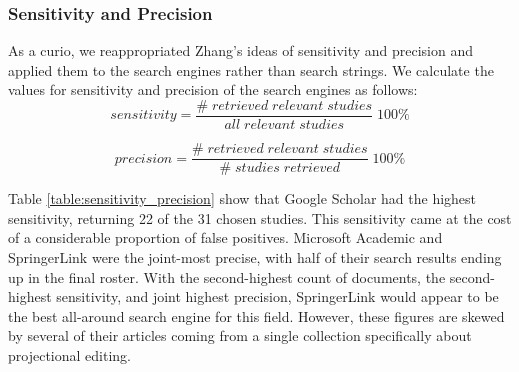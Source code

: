 \subsubsection{Sensitivity and Precision}
As a curio, we reappropriated Zhang's\cite{Zhang_2011} ideas of sensitivity and precision and applied them to the search engines rather than search strings.
We calculate the values for sensitivity and precision of the search engines as follows:
\[
        sensitivity = \frac{\#\;retrieved\;relevant\;studies}{all\;relevant\;studies} \;100\%
\]

\[
        precision = \frac{\#\;retrieved\;relevant\;studies}{\#\;studies\;retrieved} \;100\%
\]

Table \ref{table:sensitivity_precision} show that Google Scholar had the highest sensitivity, returning 22 of the 31 chosen studies.
This sensitivity came at the cost of a considerable proportion of false positives.
Microsoft Academic and SpringerLink were the joint-most precise, with half of their search results ending up in the final roster.
With the second-highest count of documents, the second-highest sensitivity, and joint highest precision, SpringerLink would appear to be the best all-around search engine for this field.
However, these figures are skewed by several of their articles coming from a single collection specifically about projectional editing.

